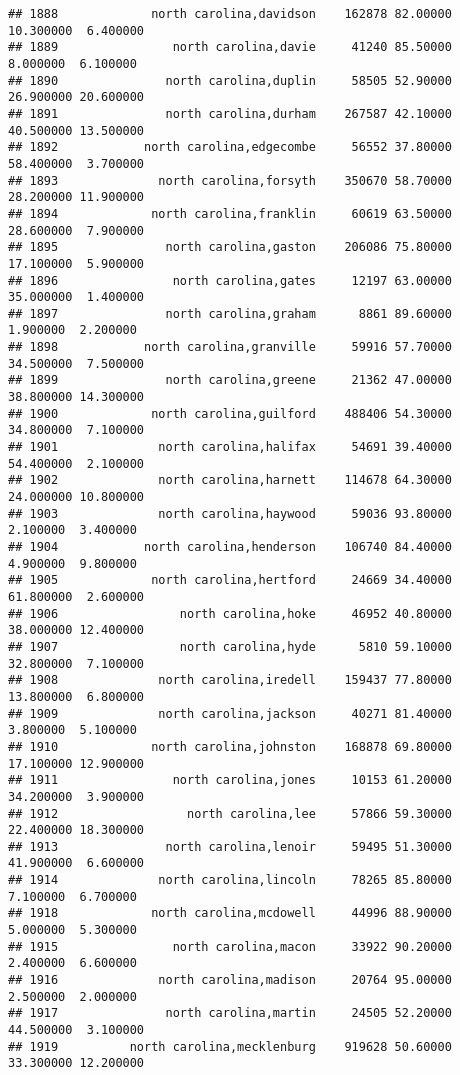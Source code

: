 \documentclass[
]{article}
\begin{document}
\begin{verbatim}
## 1888             north carolina,davidson    162878 82.00000 10.300000  6.400000
## 1889                north carolina,davie     41240 85.50000  8.000000  6.100000
## 1890               north carolina,duplin     58505 52.90000 26.900000 20.600000
## 1891               north carolina,durham    267587 42.10000 40.500000 13.500000
## 1892            north carolina,edgecombe     56552 37.80000 58.400000  3.700000
## 1893              north carolina,forsyth    350670 58.70000 28.200000 11.900000
## 1894             north carolina,franklin     60619 63.50000 28.600000  7.900000
## 1895               north carolina,gaston    206086 75.80000 17.100000  5.900000
## 1896                north carolina,gates     12197 63.00000 35.000000  1.400000
## 1897               north carolina,graham      8861 89.60000  1.900000  2.200000
## 1898            north carolina,granville     59916 57.70000 34.500000  7.500000
## 1899               north carolina,greene     21362 47.00000 38.800000 14.300000
## 1900             north carolina,guilford    488406 54.30000 34.800000  7.100000
## 1901              north carolina,halifax     54691 39.40000 54.400000  2.100000
## 1902              north carolina,harnett    114678 64.30000 24.000000 10.800000
## 1903              north carolina,haywood     59036 93.80000  2.100000  3.400000
## 1904            north carolina,henderson    106740 84.40000  4.900000  9.800000
## 1905             north carolina,hertford     24669 34.40000 61.800000  2.600000
## 1906                 north carolina,hoke     46952 40.80000 38.000000 12.400000
## 1907                 north carolina,hyde      5810 59.10000 32.800000  7.100000
## 1908              north carolina,iredell    159437 77.80000 13.800000  6.800000
## 1909              north carolina,jackson     40271 81.40000  3.800000  5.100000
## 1910             north carolina,johnston    168878 69.80000 17.100000 12.900000
## 1911                north carolina,jones     10153 61.20000 34.200000  3.900000
## 1912                  north carolina,lee     57866 59.30000 22.400000 18.300000
## 1913               north carolina,lenoir     59495 51.30000 41.900000  6.600000
## 1914              north carolina,lincoln     78265 85.80000  7.100000  6.700000
## 1918             north carolina,mcdowell     44996 88.90000  5.000000  5.300000
## 1915                north carolina,macon     33922 90.20000  2.400000  6.600000
## 1916              north carolina,madison     20764 95.00000  2.500000  2.000000
## 1917               north carolina,martin     24505 52.20000 44.500000  3.100000
## 1919          north carolina,mecklenburg    919628 50.60000 33.300000 12.200000

\end{verbatim}
\end{document}
